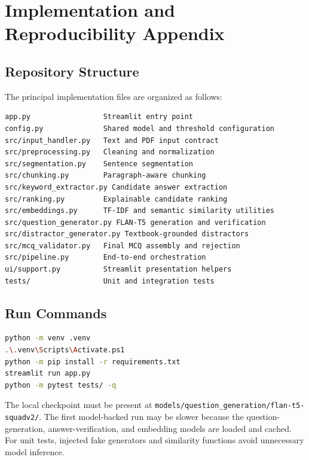 \documentclass[12pt,a4paper]{report}
\newcommand{\code}[1]{\texttt{#1}}
\begin{document}
\clearpage
\appendix
\chapter{Implementation and Reproducibility Appendix}
\section{Repository Structure}
The principal implementation files are organized as follows:
\begin{lstlisting}
app.py                 Streamlit entry point
config.py              Shared model and threshold configuration
src/input_handler.py   Text and PDF input contract
src/preprocessing.py   Cleaning and normalization
src/segmentation.py    Sentence segmentation
src/chunking.py        Paragraph-aware chunking
src/keyword_extractor.py Candidate answer extraction
src/ranking.py         Explainable candidate ranking
src/embeddings.py      TF-IDF and semantic similarity utilities
src/question_generator.py FLAN-T5 generation and verification
src/distractor_generator.py Textbook-grounded distractors
src/mcq_validator.py   Final MCQ assembly and rejection
src/pipeline.py        End-to-end orchestration
ui/support.py          Streamlit presentation helpers
tests/                 Unit and integration tests
\end{lstlisting}

\section{Run Commands}
\begin{lstlisting}[language=bash]
python -m venv .venv
.\.venv\Scripts\Activate.ps1
python -m pip install -r requirements.txt
streamlit run app.py
python -m pytest tests/ -q
\end{lstlisting}

The local checkpoint must be present at \code{models/question\_generation/flan-t5-squadv2/}. The first model-backed run may be slower because the question-generation, answer-verification, and embedding models are loaded and cached. For unit tests, injected fake generators and similarity functions avoid unnecessary model inference.
\end{document}
